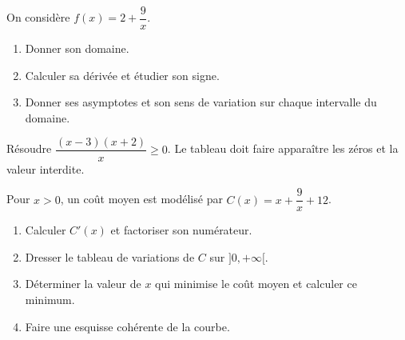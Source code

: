 \begin{exercice}
On considère $f(x)=2+\dfrac{9}x$.
\begin{enumerate}
\item Donner son domaine.
\item Calculer sa dérivée et étudier son signe.
\item Donner ses asymptotes et son sens de variation sur chaque intervalle du domaine.
\end{enumerate}
\end{exercice}
\begin{exercice}
Résoudre $\dfrac{(x-3)(x+2)}x\geq0$. Le tableau doit faire apparaître les zéros et la valeur interdite.
\end{exercice}
\begin{exercice}
Pour $x>0$, un coût moyen est modélisé par $C(x)=x+\dfrac{9}x+12$.
\begin{enumerate}
\item Calculer $C'(x)$ et factoriser son numérateur.
\item Dresser le tableau de variations de $C$ sur $]0,+\infty[$.
\item Déterminer la valeur de $x$ qui minimise le coût moyen et calculer ce minimum.
\item Faire une esquisse cohérente de la courbe.
\end{enumerate}
\end{exercice}

